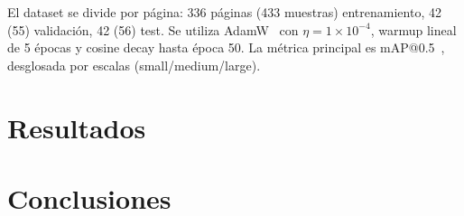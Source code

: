 \documentclass[11pt]{article}
\begin{document}
El dataset se divide por página: 336 páginas (433 muestras) entrenamiento, 42 (55) validación, 42 (56) test. Se utiliza AdamW~\cite{loshchilov2017decoupled} con $\eta = 1 \times 10^{-4}$, warmup lineal de 5 épocas y cosine decay hasta época 50. La métrica principal es mAP@0.5~\cite{everingham2010pascal}, desglosada por escalas (small/medium/large).


\section{Resultados}


\section{Conclusiones}


\newpage
\end{document}
